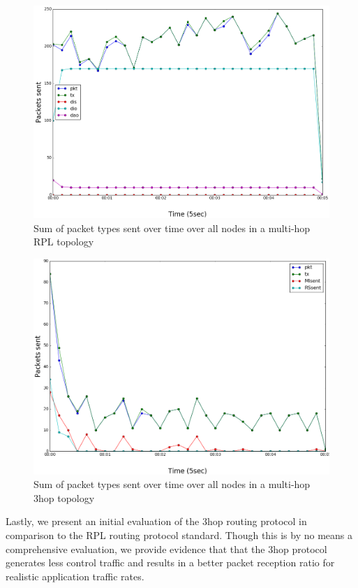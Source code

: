 \begin{figure}[t]
\centering
\includegraphics[width=\linewidth]{figs/rpl_multi_hop.png}
\caption{Sum of packet types sent over time over all nodes in a multi-hop RPL topology}
\label{fig:rpl_multi_hop}
\end{figure}

\begin{figure}[t]
\centering
\includegraphics[width=\linewidth]{figs/3hop_multi_hop.png}
\caption{Sum of packet types sent over time over all nodes in a multi-hop 3hop topology}
\label{fig:3hop_multi_hop}
\end{figure}

Lastly, we present an initial evaluation of the 3hop routing protocol in comparison to the RPL routing protocol standard.
Though this is by no means a comprehensive evaluation, we provide evidence that that the 3hop protocol generates less control traffic and results in a better packet reception ratio for realistic application traffic rates.

